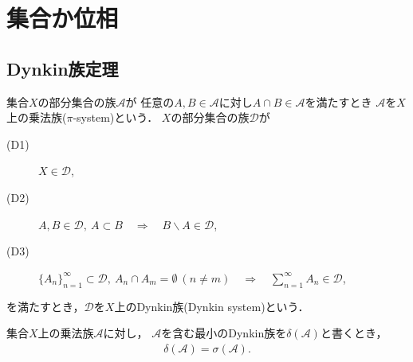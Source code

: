 \section{集合か位相}
\subsection{Dynkin族定理}
	\begin{screen}
		\begin{dfn}\label{def:Dynkin_system_theorem}
			集合$X$の部分集合の族$\mathscr{A}$が
			任意の$A,B \in \mathscr{A}$に対し$A \cap B \in \mathscr{A}$を満たすとき
			$\mathscr{A}$を$X$上の乗法族($\pi$-system)という．
			$X$の部分集合の族$\mathscr{D}$が
			\begin{description}
				\item[(D1)] $X \in \mathscr{D}$,
				\item[(D2)] $A,B \in \mathscr{D},
					\ A \subset B \quad \Longrightarrow \quad B \backslash A \in \mathscr{D}$,
				\item[(D3)] $\{A_n\}_{n=1}^\infty \subset \mathscr{D},
					\ A_n \cap A_m = \emptyset\ (n \neq m)
					\quad \Longrightarrow \quad \sum_{n=1}^\infty A_n \in \mathscr{D}$,
			\end{description}
			を満たすとき，$\mathscr{D}$を$X$上のDynkin族(Dynkin system)という．
		\end{dfn}
	\end{screen}
	
	\begin{screen}
		\begin{dfn}[Dynkin族定理]\label{thm:Dynkin_system_theorem}
			集合$X$上の乗法族$\mathscr{A}$に対し，
			$\mathscr{A}$を含む最小のDynkin族を$\delta(\mathscr{A})$と書くとき，
			\begin{align}
				\delta(\mathscr{A}) = \sigma(\mathscr{A}).
			\end{align}
		\end{dfn}
	\end{screen}
	
